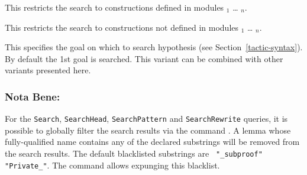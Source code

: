 \begin{Variants}
\item {}

This restricts the search to constructions defined in modules
{\module$_1$} \ldots{} {\module$_n$}.

\item {}

This restricts the search to constructions not defined in modules
{\module$_1$} \ldots{} {\module$_n$}.

\item {}

  This specifies the goal on which to search hypothesis (see
  Section~\ref{tactic-syntax}). By default the 1st goal is searched.
  This variant can be combined with other variants presented here.

\end{Variants}

\subsubsection{Nota Bene:}
For the {\tt Search}, {\tt SearchHead}, {\tt SearchPattern} and
{\tt SearchRewrite} queries, it is possible to globally filter
the search results via the command
{}.
A lemma whose fully-qualified name contains any of the declared substrings
will be removed from the search results.
The default blacklisted substrings are {\tt 
  "\_subproof" "Private\_"}. The command {} allows expunging this blacklist.


